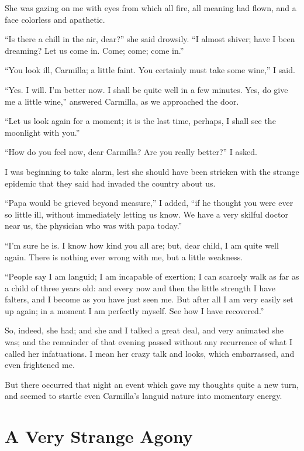 \documentclass[11pt,twoside,makeidx,hidelinks,]{memoir}
\begin{document}
She was gazing on me with eyes from which all fire, all meaning had
flown, and a face colorless and apathetic.

``Is there a chill in the air, dear?'' she said drowsily. ``I almost
shiver; have I been dreaming? Let us come in. Come; come; come in.''

``You look ill, Carmilla; a little faint. You certainly must take some
wine,'' I said.

``Yes. I will. I'm better now. I shall be quite well in a few minutes.
Yes, do give me a little wine,'' answered Carmilla, as we approached
the door.

``Let us look again for a moment; it is the last time, perhaps, I shall
see the moonlight with you.''

``How do you feel now, dear Carmilla? Are you really better?'' I asked.

I was beginning to take alarm, lest she should have been stricken with
the strange epidemic that they said had invaded the country about us.

``Papa would be grieved beyond measure,'' I added, ``if he thought you were
ever so little ill, without immediately letting us know. We have a very
skilful doctor near us, the physician who was with papa today.''

``I'm sure he is. I know how kind you all are; but, dear child, I am
quite well again. There is nothing ever wrong with me, but a
little weakness.

``People say I am languid; I am incapable of exertion; I can scarcely walk
as far as a child of three years old: and every now and then the little
strength I have falters, and I become as you have just seen me. But
after all I am very easily set up again; in a moment I am perfectly
myself. See how I have recovered.''

So, indeed, she had; and she and I talked a great deal, and very
animated she was; and the remainder of that evening passed without any
recurrence of what I called her infatuations. I mean her crazy talk and
looks, which embarrassed, and even frightened me.

But there occurred that night an event which gave my thoughts quite a
new turn, and seemed to startle even Carmilla's languid nature into
momentary energy.

\pbreak{}

\chapter{A Very Strange Agony}\hypertarget{a-very-strange-agony}{}\label{a-very-strange-agony}
\end{document}
